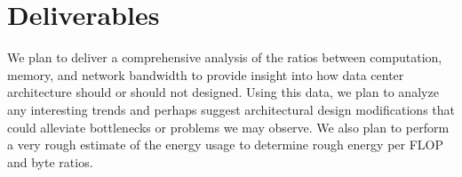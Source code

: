 \documentclass{article}
\begin{document}
\section{Deliverables}

We plan to deliver a comprehensive analysis of the ratios between computation, memory, and network bandwidth to provide insight into how data center architecture should or should not designed.
Using this data, we plan to analyze any interesting trends and perhaps suggest architectural design modifications that could alleviate bottlenecks or problems we may observe.
We also plan to perform a very rough estimate of the energy usage to determine rough energy per FLOP and byte ratios.





\end{document}
